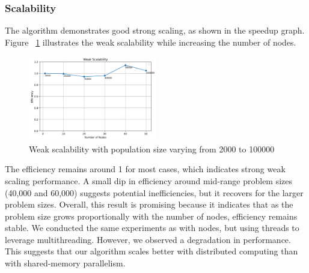 \subsubsection{Scalability}
The algorithm demonstrates good strong scaling, as shown in the speedup graph. Figure ~\ref{fig:nodes_scalability} illustrates the weak scalability while increasing the number of nodes.
\begin{figure}[h]
    \centering
    \includegraphics[width=0.5\textwidth]{figures/weak_scalability.png} %
    \caption{Weak scalability with population size varying from 2000 to 100000}
    \label{fig:nodes_scalability}
\end{figure}
\newline
The efficiency remains around 1 for most cases, which indicates strong weak scaling performance.
A small dip in efficiency around mid-range problem sizes (40,000 and 60,000) suggests potential inefficiencies, but it recovers for the larger problem sizes.
Overall, this result is promising because it indicates that as the problem size grows proportionally with the number of nodes, efficiency remains stable.
\newline
\newline
We conducted the same experiments as with nodes, but using threads to leverage multithreading. However, we observed a degradation in performance. This suggests that our algorithm scales better with distributed computing than with shared-memory parallelism.
